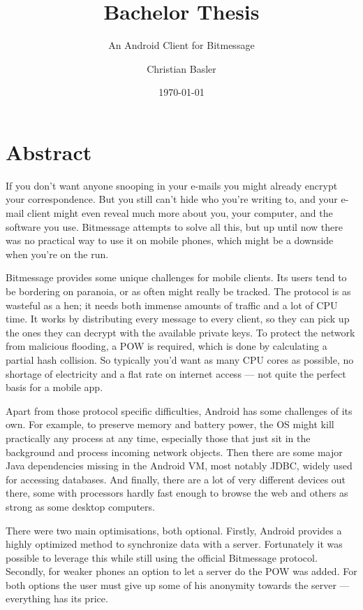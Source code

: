 \documentclass{bfh}
\title{Bachelor Thesis}
\subtitle{An Android Client for Bitmessage}
\author{Christian Basler}
\date{\today}
\begin{document}
  \maketitle

  \tableofcontents

  \newpage
  \section*{Abstract}
  If you don't want anyone snooping in your e-mails you might already encrypt your correspondence. But you still can't hide who you're writing to, and your e-mail client might even reveal much more about you, your computer, and the software you use. Bitmessage attempts to solve all this, but up until now there was no practical way to use it on mobile phones, which might be a downside when you're on the run.

  Bitmessage provides some unique challenges for mobile clients. Its users tend to be bordering on paranoia, or as often might really be tracked. The protocol is as wasteful as a hen; it needs both immense amounts of traffic and a lot of \acs{CPU} time. It works by distributing every message to every client, so they can pick up the ones they can decrypt with the available private keys. To protect the network from malicious flooding, a \acl{POW} is required, which is done by calculating a partial hash collision. So typically you'd want as many \acs{CPU} cores as possible, no shortage of electricity and a flat rate on internet access --- not quite the perfect basis for a mobile app.

  Apart from those protocol specific difficulties, Android\texttrademark{} has some challenges of its own. For example, to preserve memory and battery power, the \acl{OS} might kill practically any process at any time, especially those that just sit in the background and process incoming network objects. Then there are some major Java dependencies missing in the Android VM, most notably \acs{JDBC}, widely used for accessing databases. And finally, there are a lot of very different devices out there, some with processors hardly fast enough to browse the web and others as strong as some desktop computers.

  There were two main optimisations, both optional. Firstly, Android provides a highly optimized method to synchronize data with a server. Fortunately it was possible to leverage this while still using the official Bitmessage protocol. Secondly, for weaker phones an option to let a server do the \acl{POW} was added. For both options the user must give up some of his anonymity towards the server --- everything has its price.
\end{document}
